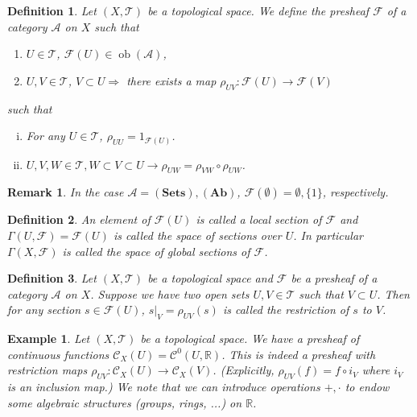 \documentclass{article}
\newtheorem{definition}{Definition}[section]
\newtheorem{remark}{Remark}[section]
\newtheorem{example}{Example}[section]
\numberwithin{equation}{section}
\DeclareMathOperator{\ob}{ob}
\begin{document}
\begin{definition}
Let $(X,\mathcal{T})$ be a topological space. We define the presheaf $\mathcal{F}$ of a category $\mathcal{A}$ on $X$ such that 
\begin{enumerate}[\textbullet]
\item $U\in\mathcal{T}$, $\mathcal{F}(U)\in\ob(\mathcal{A})$,
\item $U,V\in\mathcal{T}$, $V\subset U \Rightarrow $ there exists a map $\rho_{UV}:\mathcal{F}(U)\to\mathcal{F}(V)$ 
\end{enumerate}

such that 
\begin{enumerate}[i).]
\item For any $U\in\mathcal{T}$, $\rho_{UU}=1_{\mathcal{F}(U)}$.
\item $U,V,W\in\mathcal{T}, W\subset V\subset U\rightarrow \rho_{UW}=\rho_{VW}\circ\rho_{UW}$.
\end{enumerate}
\end{definition}

\begin{remark}
In the case $\mathcal{A} = (\mathbf{Sets}),(\mathbf{Ab})$, $\mathcal{F}(\emptyset)=\emptyset,\{1\}$, respectively.
\end{remark}

\begin{definition}
An element of $\mathcal{F}(U)$ is called a local section of $\mathcal{F}$ and $\Gamma(U,\mathcal{F}) = \mathcal{F}(U)$ is called the space of sections over $U$. In particular $\Gamma(X,\mathcal{F})$ is called the space of global sections of $\mathcal{F}$.
\end{definition}

\begin{definition}
Let $(X,\mathcal{T})$ be a topological space and $\mathcal{F}$ be a presheaf of a category $\mathcal{A}$ on $X$. Suppose we have two open sets $U,V\in\mathcal{T}$ such that $V\subset U$. Then for any section $s\in\mathcal{F}(U)$, $s|_V=\rho_{UV}(s)$ is called the restriction of $s$ to $V$.
\end{definition}

\begin{example}
Let $(X,\mathcal{T})$ be a topological space. We have a presheaf of continuous functions $\mathcal{C}_X(U)=\mathcal{C}^0(U,\mathbb{R})$. This is indeed a presheaf with restriction maps $\rho_{UV}:\mathcal{C}_X(U)\to\mathcal{C}_X(V)$. (Explicitly, $\rho_{UV}(f) = f\circ i_V$ where $i_V$ is an inclusion map.)  We note that we can introduce operations $+,\cdot$ to endow some algebraic structures (groups, rings, ...) on $\mathbb{R}$.
\end{example}
\end{document}
